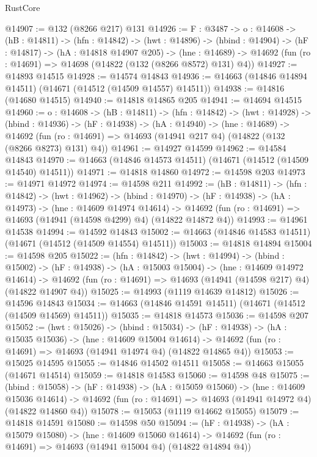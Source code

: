 \begin{lexlean}{RustCore}
\begin{coremodule}
@14907 := @132 (@8266 @217) @131
@14926 := {F : @3487} ->
  {o : @14608} ->
  (hB : @14811) ->
  (hfn : @14842) ->
  (hwt : @14896) ->
  (hbind : @14904) ->
  (hF : @14817) ->
  (hA : @14818 @14907 @205) ->
  (hne : @14689) -> @14692 (fun (ro : @14691) => @14698 (@14822 (@132 (@8266 @8572) @131) @4))
@14927 := @14893 @14515
@14928 := @14574 @14843
@14936 := @14663 (@14846 @14894 @14511) (@14671 (@14512 (@14509 @14557) @14511))
@14938 := @14816 (@14680 @14515)
@14940 := @14818 @14865 @205
@14941 := @14694 @14515
@14960 := {o : @14608} ->
  (hB : @14811) ->
  (hfn : @14842) ->
  (hwt : @14928) ->
  (hbind : @14936) ->
  (hF : @14938) ->
  (hA : @14940) ->
  (hne : @14689) ->
  @14692 (fun (ro : @14691) => @14693 (@14941 @217 @4) (@14822 (@132 (@8266 @8273) @131) @4))
@14961 := @14927 @14599
@14962 := @14584 @14843
@14970 := @14663 (@14846 @14573 @14511) (@14671 (@14512 (@14509 @14540) @14511))
@14971 := @14818 @14860
@14972 := @14598 @203
@14973 := @14971 @14972
@14974 := @14598 @211
@14992 := (hB : @14811) ->
  (hfn : @14842) ->
  (hwt : @14962) ->
  (hbind : @14970) ->
  (hF : @14938) ->
  (hA : @14973) ->
  (hne : @14609 @14974 @14614) ->
  @14692 (fun (ro : @14691) => @14693 (@14941 (@14598 @4299) @4) (@14822 @14872 @4))
@14993 := @14961 @14538
@14994 := @14592 @14843
@15002 := @14663 (@14846 @14583 @14511) (@14671 (@14512 (@14509 @14554) @14511))
@15003 := @14818 @14894
@15004 := @14598 @205
@15022 := (hfn : @14842) ->
  (hwt : @14994) ->
  (hbind : @15002) ->
  (hF : @14938) ->
  (hA : @15003 @15004) ->
  (hne : @14609 @14972 @14614) ->
  @14692 (fun (ro : @14691) => @14693 (@14941 (@14598 @217) @4) (@14822 @14907 @4))
@15025 := @14993 (@1119 @14639 @14812)
@15026 := @14596 @14843
@15034 := @14663 (@14846 @14591 @14511) (@14671 (@14512 (@14509 @14569) @14511))
@15035 := @14818 @14573
@15036 := @14598 @207
@15052 := (hwt : @15026) ->
  (hbind : @15034) ->
  (hF : @14938) ->
  (hA : @15035 @15036) ->
  (hne : @14609 @15004 @14614) ->
  @14692 (fun (ro : @14691) => @14693 (@14941 @14974 @4) (@14822 @14865 @4))
@15053 := @15025 @14595
@15055 := @14846 @14502 @14511
@15058 := @14663 @15055 (@14671 @14514)
@15059 := @14818 @14583
@15060 := @14598 @48
@15075 := (hbind : @15058) ->
  (hF : @14938) ->
  (hA : @15059 @15060) ->
  (hne : @14609 @15036 @14614) ->
  @14692 (fun (ro : @14691) => @14693 (@14941 @14972 @4) (@14822 @14860 @4))
@15078 := @15053 (@1119 @14662 @15055)
@15079 := @14818 @14591
@15080 := @14598 @50
@15094 := (hF : @14938) ->
  (hA : @15079 @15080) ->
  (hne : @14609 @15060 @14614) ->
  @14692 (fun (ro : @14691) => @14693 (@14941 @15004 @4) (@14822 @14894 @4))

\end{coremodule}
\end{lexlean}
